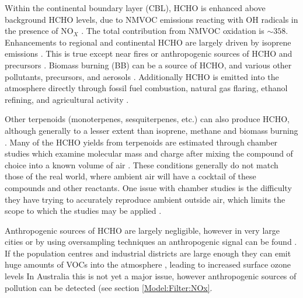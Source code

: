     Within the continental boundary layer (CBL), HCHO is enhanced above background HCHO levels, due to NMVOC emissions reacting with OH radicals in the presence of NO$_X$ \parencite{Wagner2002, Millet2006, Kefauver2014}.
    The total contribution from NMVOC oxidation is $\sim 358$\tgpyr \parencite{FortemsCheiney2012}.
    Enhancements to regional and continental HCHO are largely driven by isoprene emissions \parencite{Guenther1995,Palmer2003, Shim2005, Kefauver2014}.
    This is true except near fires or anthropogenic sources of HCHO and precursors \parencite{Guenther1995, Kefauver2014, Wolfe2016}.
    Biomass burning (BB) can be a source of HCHO, and various other pollutants, precursors, and aerosols \parencite{Guenther1995, Andreae2001}.
    Additionally HCHO is emitted into the atmosphere directly through fossil fuel combustion, natural gas flaring, ethanol refining, and agricultural activity \parencite{Wolfe2016}.
    
    Other terpenoids (monoterpenes, sesquiterpenes, etc.) can also produce HCHO, although generally to a lesser extent than isoprene, methane and biomass burning \parencite{Guenther2012}.
    Many of the HCHO yields from terpenoids are estimated through chamber studies which examine molecular mass and charge after mixing the compound of choice into a known volume of air \parencite[eg.][]{Nguyen2014}.
    These conditions generally do not match those of the real world, where ambient air will have a cocktail of these compounds and other reactants.
    One issue with chamber studies is the difficulty they have trying to accurately reproduce ambient outside air, which limits the scope to which the studies may be applied \parencite{Nguyen2014}.
    
    Anthropogenic sources of HCHO are largely negligible, however in very large cities or by using oversampling techniques an anthropogenic signal can be found \parencite{Millet2008,Zhu2014}.
    If the population centres and industrial districts are large enough they can emit huge amounts of VOCs into the atmosphere \parencite{Fu2007}, leading to increased surface ozone levels \parencite{Zhu2014}
    In Australia this is not yet a major issue, however anthropogenic sources of pollution can be detected (see section \ref{Model:Filter:NOx}.
    
